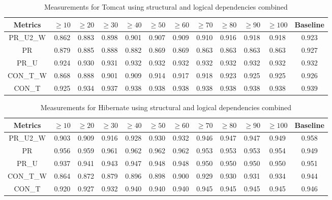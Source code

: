 \documentclass[runningheads]{comsis2}
\begin{document}
\begin{table}[!h]
\setlength\tabcolsep{3.5pt}
\caption{Measurements for Tomcat using structural and logical dependencies combined}
\label{tab:measurementscombined:tomcat}
\centering
\begin{tabular}{|c|cccccccccc|c|}
\hline
Metrics &	$\geq10$	&	$\geq20$		&	$\geq30$		&	$\geq40$		&	$\geq50$		&	$\geq60$		&	$\geq70$		&	$\geq80$		&	$\geq90$		&	$\geq100$		&	Baseline \\
\hline

PR\_U2\_W	&	0.862	&	0.883	&	0.898	&	0.901	&	0.907	&	0.909	&	0.910	&	0.916	&	0.918	&	0.918	&	0.923	\\
PR	&	0.879	&	0.885	&	0.888	&	0.882	&	0.869	&	0.869	&	0.863	&	0.863	&	0.863	&	0.863	&	0.927	\\
PR\_U	&	0.924	&	0.930	&	0.931	&	0.932	&	0.932	&	0.932	&	0.932	&	0.932	&	0.932	&	0.932	&	0.932	\\
CON\_T\_W	&	0.868	&	0.888	&	0.901	&	0.909	&	0.914	&	0.917	&	0.918	&	0.923	&	0.925	&	0.925	&	0.926	\\
CON\_T	&	0.925	&	0.934	&	0.937	&	0.938	&	0.938	&	0.938	&	0.938	&	0.938	&	0.938	&	0.938	&	0.939	\\
																										

\hline
\end{tabular}
\end{table}


\begin{table}[!h]
\setlength\tabcolsep{3.5pt}
\caption{Measurements for Hibernate using structural and logical dependencies combined}
\label{tab:measurementscombined:hibernate}
\centering
\begin{tabular}{|c|cccccccccc|c|}
\hline
Metrics &	$\geq10$	&	$\geq20$		&	$\geq30$		&	$\geq40$		&	$\geq50$		&	$\geq60$		&	$\geq70$		&	$\geq80$		&	$\geq90$		&	$\geq100$		&	Baseline \\
\hline

PR\_U2\_W	&	0.903	&	0.909	&	0.916	&	0.928	&	0.930	&	0.932	&	0.946	&	0.947	&	0.947	&	0.949	&	0.958	\\
PR	&	0.956	&	0.959	&	0.961	&	0.962	&	0.962	&	0.962	&	0.953	&	0.953	&	0.953	&	0.954	&	0.949	\\
PR\_U	&	0.937	&	0.941	&	0.943	&	0.947	&	0.948	&	0.948	&	0.950	&	0.950	&	0.950	&	0.950	&	0.951	\\
CON\_T\_W	&	0.864	&	0.872	&	0.879	&	0.896	&	0.898	&	0.900	&	0.929	&	0.930	&	0.931	&	0.934	&	0.944	\\
CON\_T	&	0.920	&	0.927	&	0.932	&	0.940	&	0.940	&	0.940	&	0.945	&	0.945	&	0.945	&	0.945	&	0.946	\\

\hline
\end{tabular}
\end{table}
\end{document}
